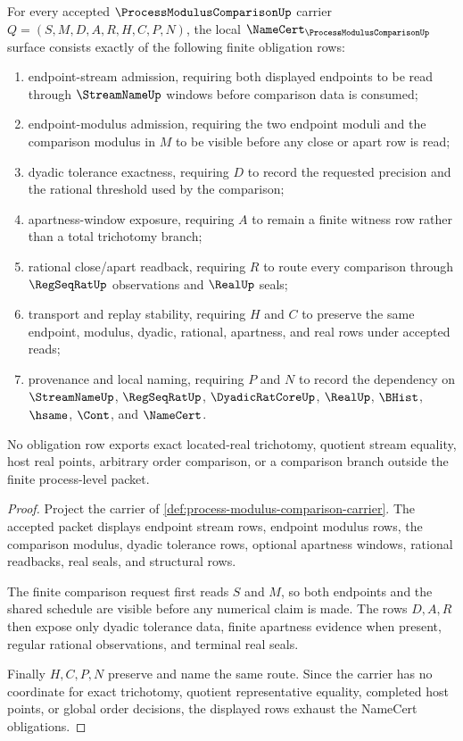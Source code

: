 \begin{theorem}
\label{thm:process-modulus-comparison-namecert-obligations}
For every accepted $\ProcessModulusComparisonUp$ carrier $Q=(S,M,D,A,R,H,C,P,N)$, the local $\NameCert_{\ProcessModulusComparisonUp}$ surface consists exactly of the following finite obligation rows:
\begin{enumerate}
\item endpoint-stream admission, requiring both displayed endpoints to be read through $\StreamNameUp$ windows before comparison data is consumed;
\item endpoint-modulus admission, requiring the two endpoint moduli and the comparison modulus in $M$ to be visible before any close or apart row is read;
\item dyadic tolerance exactness, requiring $D$ to record the requested precision and the rational threshold used by the comparison;
\item apartness-window exposure, requiring $A$ to remain a finite witness row rather than a total trichotomy branch;
\item rational close/apart readback, requiring $R$ to route every comparison through $\RegSeqRatUp$ observations and $\RealUp$ seals;
\item transport and replay stability, requiring $H$ and $C$ to preserve the same endpoint, modulus, dyadic, rational, apartness, and real rows under accepted reads;
\item provenance and local naming, requiring $P$ and $N$ to record the dependency on $\StreamNameUp$, $\RegSeqRatUp$, $\DyadicRatCoreUp$, $\RealUp$, $\BHist$, $\hsame$, $\Cont$, and $\NameCert$.
\end{enumerate}
No obligation row exports exact located-real trichotomy, quotient stream equality, host real points, arbitrary order comparison, or a comparison branch outside the finite process-level packet.
\end{theorem}
\begin{proof}
Project the carrier of \autoref{def:process-modulus-comparison-carrier}. The accepted packet displays endpoint stream rows, endpoint modulus rows, the comparison modulus, dyadic tolerance rows, optional apartness windows, rational readbacks, real seals, and structural rows.

The finite comparison request first reads $S$ and $M$, so both endpoints and the shared schedule are visible before any numerical claim is made. The rows $D,A,R$ then expose only dyadic tolerance data, finite apartness evidence when present, regular rational observations, and terminal real seals.

Finally $H,C,P,N$ preserve and name the same route. Since the carrier has no coordinate for exact trichotomy, quotient representative equality, completed host points, or global order decisions, the displayed rows exhaust the NameCert obligations.
\end{proof}

